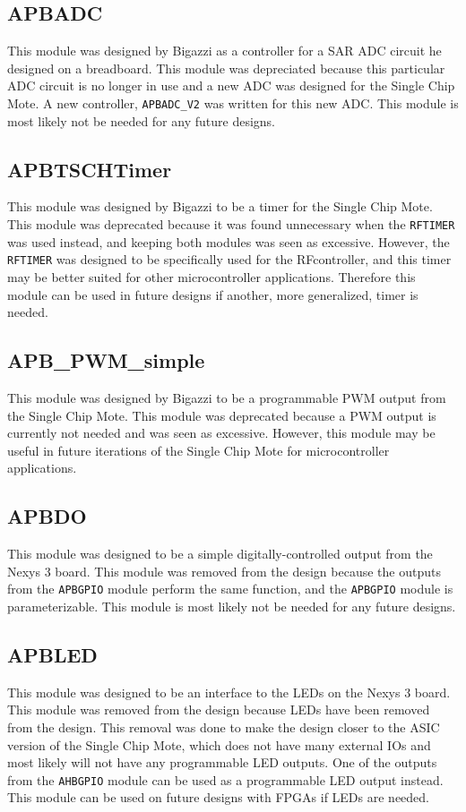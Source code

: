 \subsection{APBADC}
This module was designed by Bigazzi as a controller for a SAR ADC circuit he designed on a breadboard. This module was depreciated because this particular ADC circuit is no longer in use and a new ADC was designed for the Single Chip Mote. A new controller, \texttt{APBADC\_V2} was written for this new ADC. This module is most likely not be needed for any future designs.

\subsection{APBTSCHTimer}
This module was designed by Bigazzi to be a timer for the Single Chip Mote. This module was deprecated because it was found unnecessary when the \texttt{RFTIMER} was used instead, and keeping both modules was seen as excessive. However, the \texttt{RFTIMER} was designed to be specifically used for the RFcontroller, and this timer may be better suited for other microcontroller applications. Therefore this module can be used in future designs if another, more generalized, timer is needed.

\subsection{APB\_PWM\_simple}
This module was designed by Bigazzi to be a programmable PWM output from the Single Chip Mote. This module was deprecated because a PWM output is currently not needed and was seen as excessive. However, this module may be useful in future iterations of the Single Chip Mote for microcontroller applications.

\subsection{APBDO}
This module was designed to be a simple digitally-controlled output from the Nexys 3 board. This module was removed from the design because the outputs from the \texttt{APBGPIO} module perform the same function, and the \texttt{APBGPIO} module is parameterizable. This module is most likely not be needed for any future designs.

\subsection{APBLED}
This module was designed to be an interface to the LEDs on the Nexys 3 board. This module was removed from the design because LEDs have been removed from the design. This removal was done to make the design closer to the ASIC version of the Single Chip Mote, which does not have many external IOs and most likely will not have any programmable LED outputs. One of the outputs from the \texttt{AHBGPIO} module can be used as a programmable LED output instead. This module can be used on future designs with FPGAs if LEDs are needed.

